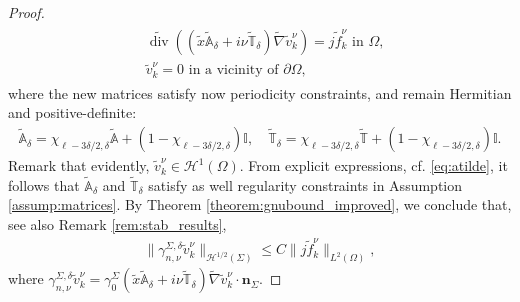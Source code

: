 \documentclass[report]{elsarticle}
\numberwithin{theorem}{section}
\renewcommand{\vec}[1]{\mathbf{#1}}
\begin{document}
\begin{proof}
\begin{align}
	\label{eq:vnuk_pb}
	\begin{split}
	&\widetilde{\operatorname{div}}((\tilde{x}\widetilde{\mathbb{A}}_{\delta}+i\nu\widetilde{\mathbb{T}}_{\delta})\widetilde{\nabla}\widetilde{v}^{\nu}_k)=j\widetilde{f}^{\nu}_k\text{ in }\Omega,\\
	&\widetilde{v}^{\nu}_k=0 \text{ in a vicinity of }\partial\Omega, 
	\end{split}
\end{align}
where the new matrices satisfy now periodicity constraints, and remain Hermitian and positive-definite:
\begin{align*}
\widetilde{\mathbb{A}}_{\delta}= \chi_{\ell-3\delta/2,\delta}\widetilde{\mathbb{A}}+(1-\chi_{\ell-3\delta/2,\delta})\mathbb{I}, \quad \widetilde{\mathbb{T}}_{\delta}= \chi_{\ell-3\delta/2,\delta}\widetilde{\mathbb{T}}+(1-\chi_{\ell-3\delta/2,\delta})\mathbb{I}.
\end{align*}
Remark that evidently, $\widetilde{v}_k^{\nu}\in \mathcal{H}^1(\Omega)$. From explicit expressions, cf. \eqref{eq:atilde}, it follows that  $\widetilde{\mathbb{A}}_{\delta}$ and $\widetilde{\mathbb{T}}_{\delta}$ satisfy as well regularity constraints in Assumption \ref{assump:matrices}. %
By Theorem \ref{theorem:gnubound_improved}, we conclude that, see also Remark \ref{rem:stab_results},
\begin{align}
	\label{eq:gammannu}
	\|\gamma_{n,\nu}^{\Sigma,\delta}\widetilde{v}_k^{\nu}\|_{\mathcal{H}^{1/2}(\Sigma)}\leq C\|j\widetilde{f}^{\nu}_k\|_{L^2(\Omega)},
\end{align}
where $\gamma_{n,\nu}^{\Sigma,\delta}\widetilde{v}_k^{\nu}=\gamma_0^{\Sigma}(\widetilde{x}\widetilde{\mathbb{A}}_{\delta}+i\nu \widetilde{\mathbb{T}}_{\delta})\widetilde{\nabla}\tilde{v}_k^{\nu}\cdot \vec{n}_{\Sigma}$. 


\end{proof}
\end{document}
